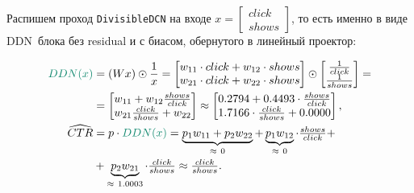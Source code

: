 \documentclass{report}
\begin{document}
\par Распишем проход \texttt{DivisibleDCN} на входе $x = \begin{bmatrix} click \\ shows \end{bmatrix}$, то есть именно в виде \color{PineGreen}DDN\color{black}\ блока без residual и с биасом, обернутого в линейный проектор:
\begin{tcolorbox}[title=DDN блок с обученными числами, colframe=PineGreen!90, breakable, enhanced]
    \begin{align}
        \label{dcnddn:code:weights:forward}
        \color{PineGreen}DDN(x)\color{black}
        &= (Wx)\odot \frac{1}{x}
        =
        \begin{bmatrix}
            w_{11}\cdot click + w_{12}\cdot shows\\
            w_{21}\cdot click + w_{22}\cdot shows
        \end{bmatrix}
        \odot
        \begin{bmatrix}
            \tfrac{1}{click}\\
            \tfrac{1}{shows}
        \end{bmatrix}
        =\\
        &=
        \begin{bmatrix}
            w_{11} + w_{12}\tfrac{shows}{click}\\
            w_{21}\tfrac{click}{shows} + w_{22}
        \end{bmatrix}
        \approx
        \begin{bmatrix}
            0.2794 + 0.4493\cdot \tfrac{shows}{click}\\
            1.7166\cdot \tfrac{click}{shows} + 0.0000
        \end{bmatrix},\\
        \widehat{CTR} &= p\cdot \color{PineGreen}DDN(x)\color{black}
        = \underbrace{p_1 w_{11} + p_2 w_{22}}_{\approx\ 0}
        + \underbrace{p_1 w_{12}}_{\approx\ 0}\cdot\tfrac{shows}{click} + \\
        &+ \underbrace{p_2 w_{21}}_{\approx\ 1.0003}\cdot\tfrac{click}{shows}
        \approx \tfrac{click}{shows}.
    \end{align}
\end{tcolorbox}
\end{document}
